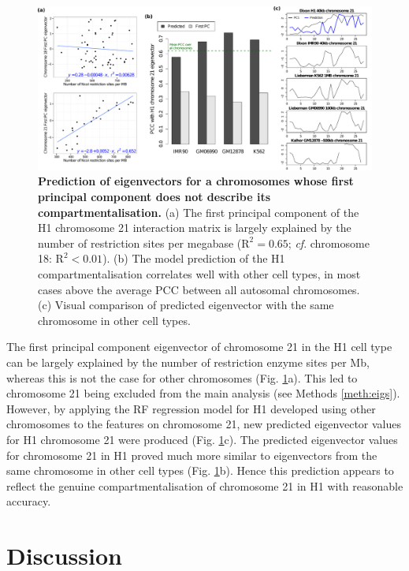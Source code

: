 \documentclass[a4paper]{report}
\begin{document}
\begin{figure}[H]
\begin{center}
\includegraphics[width=1.05\textwidth]{figs/s_c21_v2.pdf}
\captionsetup{width=\textwidth}
\caption{ {\bf Prediction of eigenvectors for a chromosomes whose first principal component
  does not describe its compartmentalisation.}  
(a) The first principal component of the H1 chromosome 21 interaction
matrix is largely explained by the number of restriction sites per
megabase ($\mathrm{R}^2 = 0.65$; \emph{cf}. chromosome 18: $\mathrm{R}^2 <
0.01$). (b) The model prediction of the H1 compartmentalisation
correlates well with other cell types, in most cases above the average
PCC between all autosomal chromosomes. (c) Visual comparison of predicted eigenvector with the same
chromosome in other cell types.
}\label{fig:c21}
\end{center} 
\end{figure} 

The first principal component eigenvector of chromosome 21 in the H1
cell type can be largely explained by the number of restriction enzyme
sites per Mb, whereas this is not the case for other chromosomes
(Fig. \ref{fig:c21}a). This led to chromosome 21 being excluded from
the main analysis (see Methods \ref{meth:eigs}). However, by applying
the RF regression model for H1 developed using other chromosomes to the
features on chromosome 21, new predicted eigenvector values for H1
chromosome 21 were produced (Fig. \ref{fig:c21}c). The predicted
eigenvector values for chromosome 21 in H1 proved much more
similar to eigenvectors from the same chromosome in other cell
types (Fig. \ref{fig:c21}b). Hence this prediction appears to reflect the genuine compartmentalisation of chromosome 21 in H1 with
reasonable accuracy.

\chapter{Discussion}
\end{document}
